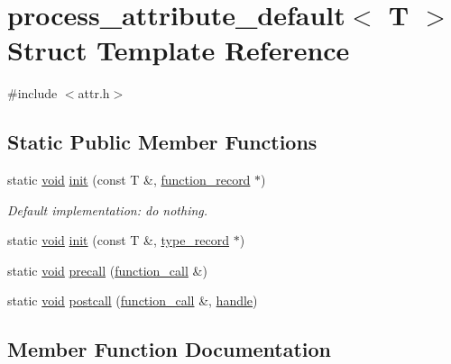 \hypertarget{structprocess__attribute__default}{}\section{process\+\_\+attribute\+\_\+default$<$ T $>$ Struct Template Reference}
\label{structprocess__attribute__default}


{\ttfamily \#include $<$attr.\+h$>$}

\subsection*{Static Public Member Functions}
\begin{DoxyCompactItemize}
\item 
static \mbox{\hyperlink{_s_d_l__opengles2__gl2ext_8h_ae5d8fa23ad07c48bb609509eae494c95}{void}} \mbox{\hyperlink{structprocess__attribute__default_a5c9bf3410349e942871e45c5c0097a23}{init}} (const T \&, \mbox{\hyperlink{structfunction__record}{function\+\_\+record}} $\ast$)
\begin{DoxyCompactList}\small\item\em Default implementation\+: do nothing. \end{DoxyCompactList}\item 
static \mbox{\hyperlink{_s_d_l__opengles2__gl2ext_8h_ae5d8fa23ad07c48bb609509eae494c95}{void}} \mbox{\hyperlink{structprocess__attribute__default_af4eb354b90c89daf1c6430d8353c68bb}{init}} (const T \&, \mbox{\hyperlink{structtype__record}{type\+\_\+record}} $\ast$)
\item 
static \mbox{\hyperlink{_s_d_l__opengles2__gl2ext_8h_ae5d8fa23ad07c48bb609509eae494c95}{void}} \mbox{\hyperlink{structprocess__attribute__default_a703f4c14d30193e0747ed6f5208f1451}{precall}} (\mbox{\hyperlink{structfunction__call}{function\+\_\+call}} \&)
\item 
static \mbox{\hyperlink{_s_d_l__opengles2__gl2ext_8h_ae5d8fa23ad07c48bb609509eae494c95}{void}} \mbox{\hyperlink{structprocess__attribute__default_a64c1e0e463184964bcfce2c26fce7849}{postcall}} (\mbox{\hyperlink{structfunction__call}{function\+\_\+call}} \&, \mbox{\hyperlink{classhandle}{handle}})
\end{DoxyCompactItemize}


\subsection{Member Function Documentation}
\mbox{\label{structprocess__attribute__default_a5c9bf3410349e942871e45c5c0097a23}} 

